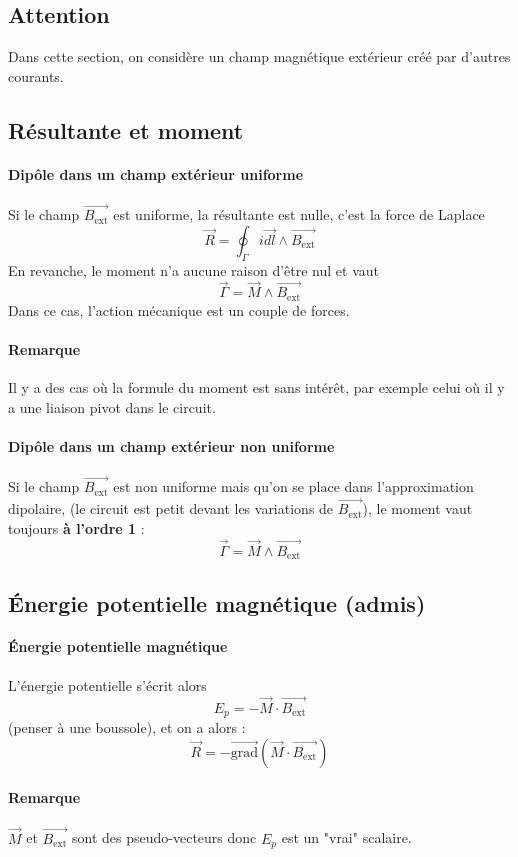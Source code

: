 \documentclass[french]{book}
\theoremstyle{plain}
\theoremstyle{definition}
\theoremstyle{remark}
\newcommand{\grad}{\overrightarrow{\text{grad}}}
\begin{document}
\subsection{Attention}
Dans cette section, on considère un champ magnétique extérieur créé par d'autres courants.
\subsection{Résultante et moment}
\paragraph{Dipôle dans un champ extérieur uniforme} Si le champ $\overrightarrow{B_\text{ext}}$ est uniforme, la résultante est nulle, c'est la force de Laplace $$\overrightarrow{R}=\oint_\Gamma i\overrightarrow{dl}\wedge\overrightarrow{B_\text{ext}}$$ En revanche, le moment n'a aucune raison d'être nul et vaut $$\overrightarrow{\Gamma}=\overrightarrow{M}\wedge\overrightarrow{B_\text{ext}}$$ Dans ce cas, l'action mécanique est un couple de forces.
\paragraph{Remarque} Il y a des cas où la formule du moment est sans intérêt, par exemple celui où il y a une liaison pivot dans le circuit.
\paragraph{Dipôle dans un champ extérieur non uniforme}Si le champ $\overrightarrow{B_\text{ext}}$ est non uniforme mais qu'on se place dans l'approximation dipolaire, (le circuit est petit devant les variations de $\overrightarrow{B_\text{ext}}$), le moment vaut toujours \textbf{à l'ordre 1} : $$\overrightarrow{\Gamma}=\overrightarrow{M}\wedge\overrightarrow{B_\text{ext}}$$
\subsection{Énergie potentielle magnétique (admis)}
\paragraph{Énergie potentielle magnétique}L'énergie potentielle s'écrit alors $$E_p=-\overrightarrow{M}\cdot\overrightarrow{B_\text{ext}}$$ (penser à une boussole), et on a alors : $$\overrightarrow{R}=-\grad\left(\overrightarrow{M}\cdot\overrightarrow{B_\text{ext}}\right)$$
\paragraph{Remarque} $\overrightarrow{M}$ et $\overrightarrow{B_\text{ext}}$ sont des pseudo-vecteurs donc $E_p$ est un "vrai" scalaire.
\end{document}
